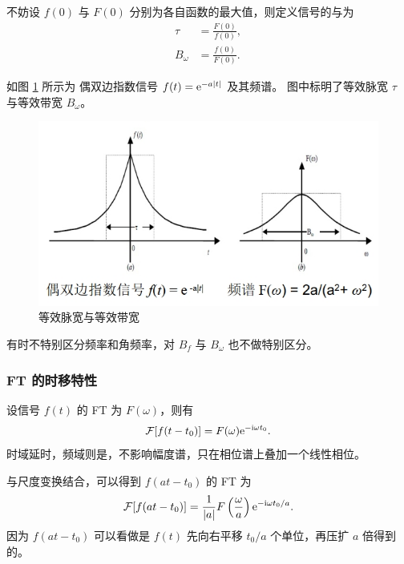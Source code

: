 \begin{definition}[等效脉宽与等效带宽]
    不妨设 $f(0)$ 与 $F(0)$ 分别为各自函数的最大值，则定义信号的与为
    \begin{align*}
        \tau & = \frac{F(0)}{f(0)}, \\
        B_\omega & = \frac{f(0)}{F(0)}.
    \end{align*}
\end{definition}

\begin{example}
    如图 \ref{fig:equivalent-bandwidth-and-pulse-width} 所示为
    偶双边指数信号 $f(t) = \mathrm{e}^{-a|t|}$ 及其频谱。
    图中标明了等效脉宽 $\tau$ 与等效带宽 $B_\omega$。
    \begin{figure}[H]
        \centering
        \includegraphics[width = 0.6\linewidth]{chap2/img/equivalent-bandwidth-and-pulse-width.png}
        \caption{等效脉宽与等效带宽}
        \label{fig:equivalent-bandwidth-and-pulse-width}
    \end{figure}
\end{example}

\begin{note}
    有时不特别区分频率和角频率，对 $B_f$ 与 $B_\omega$ 也不做特别区分。
\end{note}

\subsubsection{FT 的时移特性}

\begin{property}
    设信号 $f(t)$ 的 FT 为 $F(\omega)$，则有
    \begin{align*}
        \mathcal{F}[f(t - t_0)] = F(\omega)\mathrm{e}^{-\mathrm{i}\omega t_0}.
    \end{align*}
    时域延时，频域则是，不影响幅度谱，只在相位谱上叠加一个线性相位。

    与尺度变换结合，可以得到 $f(at - t_0)$ 的 FT 为
    \begin{align*}
        \mathcal{F}[f(at - t_0)] = \frac{1}{|a|}F\left(\frac{\omega}{a}\right)\mathrm{e}^{-\mathrm{i}\omega t_0/a}.
    \end{align*}
    因为 $f(at - t_0)$ 可以看做是 $f(t)$ 先向右平移 $t_0 / a$ 个单位，再压扩 $a$ 倍得到的。
\end{property}

